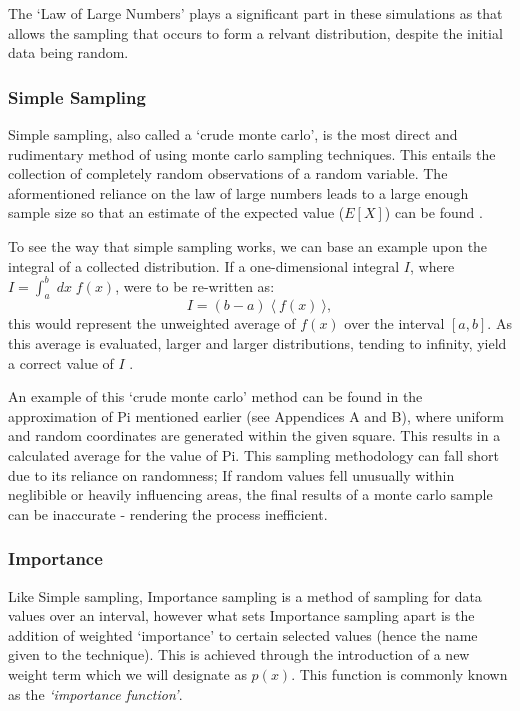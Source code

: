 \documentclass[11pt,a4paper]{article}
\begin{document}
        The `Law of Large Numbers' plays a significant part in these simulations as that allows the sampling that occurs to form a relvant distribution, despite the initial data being random.
        
        \subsubsection{Simple Sampling}
            Simple sampling, also called a `crude monte carlo', is the most direct and rudimentary method of using monte carlo sampling techniques.
            This entails the collection of completely random observations of a random variable.
            The aformentioned reliance on the law of large numbers leads to a large enough sample size so that an estimate of the expected value ($E[X]$) can be found \citep{KTH}.

            To see the way that simple sampling works, we can base an example upon the integral of a collected distribution.
            If a one-dimensional integral $I$, where $I = \int_{a}^{b}\; dx\; f(x)$, were to be re-written as:
            \[I = (b - a)\; \langle\: f(x)\: \rangle,\]
            this would represent the unweighted average of $f(x)$ over the interval $[a, b]$.
            As this average is evaluated, larger and larger distributions, tending to infinity, yield a correct value of $I$ \citep{Frenkel96}.

            An example of this `crude monte carlo' method can be found in the approximation of Pi mentioned earlier (see Appendices A and B),
            where uniform and random coordinates are generated within the given square. This results in a calculated average for the value of Pi.
            This sampling methodology can fall short due to its reliance on randomness; If random values fell unusually within neglibible or heavily influencing areas, the final results of a monte carlo sample can be inaccurate - rendering the process inefficient.


        \subsubsection{Importance}
            Like Simple sampling, Importance sampling is a method of sampling for data values over an interval, however what sets Importance sampling apart is the addition of weighted `importance' to certain selected values (hence the name given to the technique).
            This is achieved through the introduction of a new weight term which we will designate as $p(x)$. This function is commonly known as the \textit{`importance function'}.
\end{document}
